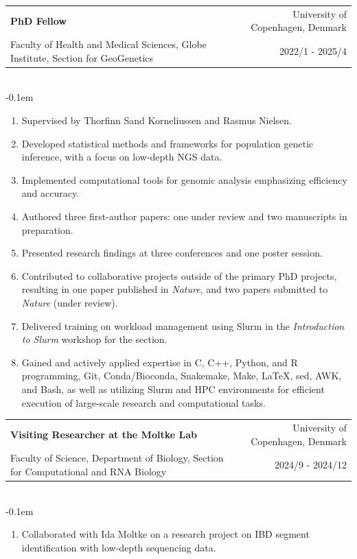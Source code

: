\documentclass[letterpaper,10.5pt]{article}
\makeatletter
\newcommand{\cvSubheading}[5]{
  \vspace{-1pt}\item
    \begin{tabular*}{0.97\textwidth}{l@{\extracolsep{\fill}}r}
      \textbf{#1} & #2 \\
      {\small#3} & {\small #4} \\
    \end{tabular*}\vspace{3pt} \\
    #5
}
\makeatother
\begin{document}
        \cvSubheading
        {PhD Fellow}
        {University of Copenhagen, Denmark}
        {Faculty of Health and Medical Sciences, Globe Institute, Section for GeoGenetics}
        {2022/1 - 2025/4}
            \vspace{-0.1em} \begin{enumerate}[label=\textbf{-},nosep,wide,  labelindent=0pt]
        \item Supervised by Thorfinn Sand Korneliussen and Rasmus Nielsen.
        \item Developed statistical methods and frameworks for population genetic inference, with a focus on low-depth NGS data.
        \item Implemented computational tools for genomic analysis emphasizing efficiency and accuracy.
        \item Authored three first-author papers: one under review and two manuscripts in preparation.
        \item Presented research findings at three conferences and one poster session.
        \item Contributed to collaborative projects outside of the primary PhD projects, resulting in one paper published in \textit{Nature}, and two papers submitted to \textit{Nature} (under review).
        \item Delivered training on workload management using Slurm in the \textit{Introduction to Slurm} workshop for the section.
        \item Gained and actively applied expertise in C, C++, Python, and R programming, Git, Conda/Bioconda, Snakemake, Make, \LaTeX, sed, AWK, and Bash, as well as utilizing Slurm and HPC environments for efficient execution of large-scale research and computational tasks.
        \end{enumerate}


    \medskip

      
        \cvSubheading
        {Visiting Researcher at the Moltke Lab}
        {University of Copenhagen, Denmark}
        {Faculty of Science, Department of Biology, Section for Computational and RNA Biology}
        {2024/9 - 2024/12}
          \vspace{-0.1em} \begin{enumerate}[label=\textbf{-},nosep,wide,  labelindent=0pt]
        \item Collaborated with Ida Moltke on a research project on IBD segment identification with low-depth sequencing data.
        \end{enumerate}
    
\end{document}

